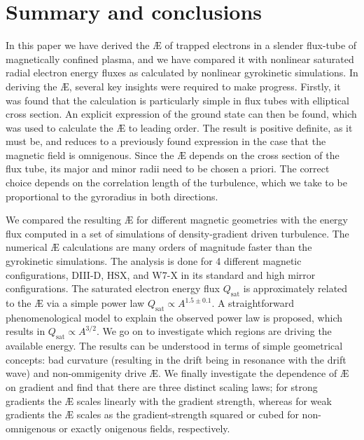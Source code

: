 \section{Summary and conclusions} 
\label{sec:conclusions}
In this paper we have derived the \AE{} of trapped electrons in a slender flux-tube of magnetically confined plasma, and we have compared it with nonlinear saturated radial electron energy fluxes as calculated by nonlinear gyrokinetic simulations. In deriving the \AE{}, several key insights were required to make progress. Firstly, it was found that the calculation is particularly simple in flux tubes with elliptical cross section. An explicit expression of the ground state can then be found, which was used to calculate the \AE{} to leading order. The result is positive definite, as it must be, and reduces to a previously found expression in the case that the magnetic field is omnigenous. Since the \AE{} depends on the cross section of the flux tube, its major and minor radii need to be chosen a priori. The correct choice depends on the correlation length of the turbulence, which we take to be proportional to the gyroradius in both directions.
\par
We compared the resulting \AE{} for different magnetic geometries with the energy flux computed in a set of simulations of density-gradient driven turbulence. The numerical \AE{} calculations are many orders of magnitude faster than the gyrokinetic simulations. The analysis is done for 4 different magnetic configurations, DIII-D, HSX, and W7-X in its standard and high mirror configurations. The saturated electron energy flux $Q_\text{sat}$ is approximately related to the \AE{} via a simple power law $Q_\text{sat} \propto A^{1.5 \pm 0.1}$. A straightforward phenomenological model to explain the observed power law is proposed, which results in $Q_\text{sat} \propto A^{3/2}$. We go on to investigate which regions are driving the available energy. The results can be understood in terms of simple geometrical concepts: bad curvature (resulting in the drift being in resonance with the drift wave) and non-ommigenity drive \AE{}. We finally investigate the dependence of \AE{} on gradient and find that there are three distinct scaling laws; for strong gradients the \AE{} scales linearly with the gradient strength, whereas for weak gradients the \AE{} scales as the gradient-strength squared or cubed for non-omnigenous or exactly onigenous fields, respectively. 
\par 
